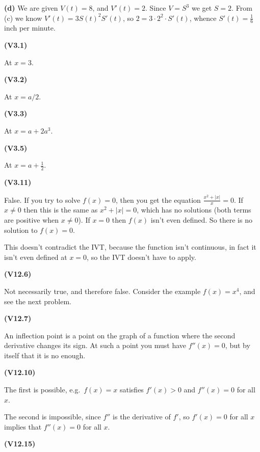 \documentclass[openany,reqno]{amsbook}
\begin{document}
\begin{trivlist}
  \textbf{(d)} We are given $V(t) = 8$, and $V'(t)=2$.  Since $V=S^3$
  we get $S=2$.  From (c) we know $V'(t)=3S(t)^2 S'(t)$, so $2 =
  3\cdot 2^2\cdot S'(t)$, whence $S'(t) = \frac16$ inch per minute.
  \bigskip

\item[{\bf(V3.1)}]

  At $x=3$.
  \bigskip

\item[{\bf(V3.2)}]

  At $x=a/2$.
  \bigskip

\item[{\bf(V3.3)}]

  At $x=a+2a^3$.
  \bigskip

\item[{\bf(V3.5)}]

  At $x=a+\frac12$.
  \bigskip

\item[{\bf(V3.11)}]

  False.  If you try to solve $f(x) = 0$, then you get the equation
  $\frac{x^2+|x|}{x}=0$.  If $x\ne0$ then this is the same as
  $x^2+|x|=0$, which has no solutions (both terms are positive when
  $x\ne0$).  If $x=0$ then $f(x)$ isn't even defined.
  So there is no solution to $f(x) = 0$.

  This doesn't contradict the IVT, because the function isn't
  continuous, in fact it isn't even defined at $x=0$, so the IVT
  doesn't have to apply.
  \bigskip

\item[{\bf(V12.6)}]

  Not necessarily true, and therefore false.  Consider the example
  $f(x)=x^4$, and see the next problem.
  \bigskip

\item[{\bf(V12.7)}]

  An inflection point is a point on the graph of a function where the
  second derivative changes its sign.  At such a point you must have
  $f''(x) = 0$, but by itself that it is no enough.
  \bigskip

\item[{\bf(V12.10)}]

  The first is possible, e.g.~$f(x) = x$ satisfies $f'(x)>0$ and
  $f''(x)=0$ for all $x$.

  The second is impossible, since $f''$ is the derivative of
  $f'$, so $f'(x) = 0$ for all $x$ implies that
  $f''(x)=0$ for all $x$.
  \bigskip

\item[{\bf(V12.15)}]


\end{trivlist}
\end{document}
